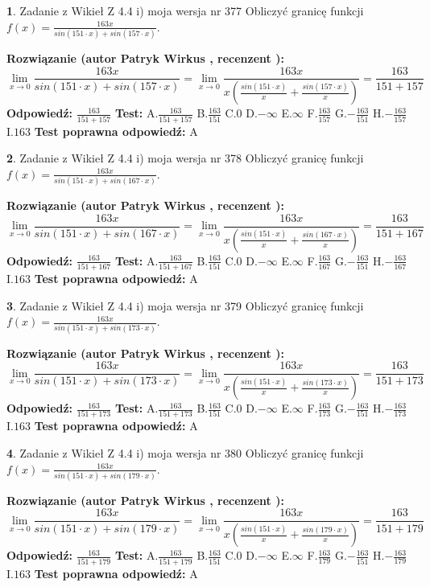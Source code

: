 \documentclass[12pt, a4paper]{article}
\theoremstyle{definition} %
\newtheorem{zad}{}
\newcommand{\zadStart}[1]{\begin{zad}#1\newline}
\newcommand{\zadStop}{\end{zad}}
\newcommand{\rozwStart}[2]{\noindent \textbf{Rozwiązanie (autor #1 , recenzent #2): }\newline}
\newcommand{\rozwStop}{\newline}
\newcommand{\odpStart}{\noindent \textbf{Odpowiedź:}\newline}
\newcommand{\odpStop}{\newline}
\newcommand{\testStart}{\noindent \textbf{Test:}\newline}
\newcommand{\testStop}{\newline}
\newcommand{\kluczStart}{\noindent \textbf{Test poprawna odpowiedź:}\newline}
\newcommand{\kluczStop}{\newline}
\begin{document}
\zadStart{Zadanie z Wikieł Z 4.4 i) moja wersja nr 377}
Obliczyć granicę funkcji $f(x)=\frac{163x}{sin(151\cdot x) +sin(157\cdot x)}$.
\zadStop
\rozwStart{Patryk Wirkus}{}
$$\lim\limits_{x\to 0}\frac{163x}{sin(151\cdot x) +sin(157\cdot x)}=\lim\limits_{x\to 0}\frac{163x}{x(\frac{sin(151\cdot x)}{x}+\frac{sin(157\cdot x)}{x})}=\frac{163}{151+157}$$
\rozwStop
\odpStart
$\frac{163}{151+157}$
\odpStop
\testStart
A.$\frac{163}{151+157}$
B.$\frac{163}{151}$
C.$0$
D.$-\infty$
E.$\infty$
F.$\frac{163}{157}$
G.$-\frac{163}{151}$
H.$-\frac{163}{157}$
I.$163$
\testStop
\kluczStart
A
\kluczStop



\zadStart{Zadanie z Wikieł Z 4.4 i) moja wersja nr 378}
Obliczyć granicę funkcji $f(x)=\frac{163x}{sin(151\cdot x) +sin(167\cdot x)}$.
\zadStop
\rozwStart{Patryk Wirkus}{}
$$\lim\limits_{x\to 0}\frac{163x}{sin(151\cdot x) +sin(167\cdot x)}=\lim\limits_{x\to 0}\frac{163x}{x(\frac{sin(151\cdot x)}{x}+\frac{sin(167\cdot x)}{x})}=\frac{163}{151+167}$$
\rozwStop
\odpStart
$\frac{163}{151+167}$
\odpStop
\testStart
A.$\frac{163}{151+167}$
B.$\frac{163}{151}$
C.$0$
D.$-\infty$
E.$\infty$
F.$\frac{163}{167}$
G.$-\frac{163}{151}$
H.$-\frac{163}{167}$
I.$163$
\testStop
\kluczStart
A
\kluczStop



\zadStart{Zadanie z Wikieł Z 4.4 i) moja wersja nr 379}
Obliczyć granicę funkcji $f(x)=\frac{163x}{sin(151\cdot x) +sin(173\cdot x)}$.
\zadStop
\rozwStart{Patryk Wirkus}{}
$$\lim\limits_{x\to 0}\frac{163x}{sin(151\cdot x) +sin(173\cdot x)}=\lim\limits_{x\to 0}\frac{163x}{x(\frac{sin(151\cdot x)}{x}+\frac{sin(173\cdot x)}{x})}=\frac{163}{151+173}$$
\rozwStop
\odpStart
$\frac{163}{151+173}$
\odpStop
\testStart
A.$\frac{163}{151+173}$
B.$\frac{163}{151}$
C.$0$
D.$-\infty$
E.$\infty$
F.$\frac{163}{173}$
G.$-\frac{163}{151}$
H.$-\frac{163}{173}$
I.$163$
\testStop
\kluczStart
A
\kluczStop



\zadStart{Zadanie z Wikieł Z 4.4 i) moja wersja nr 380}
Obliczyć granicę funkcji $f(x)=\frac{163x}{sin(151\cdot x) +sin(179\cdot x)}$.
\zadStop
\rozwStart{Patryk Wirkus}{}
$$\lim\limits_{x\to 0}\frac{163x}{sin(151\cdot x) +sin(179\cdot x)}=\lim\limits_{x\to 0}\frac{163x}{x(\frac{sin(151\cdot x)}{x}+\frac{sin(179\cdot x)}{x})}=\frac{163}{151+179}$$
\rozwStop
\odpStart
$\frac{163}{151+179}$
\odpStop
\testStart
A.$\frac{163}{151+179}$
B.$\frac{163}{151}$
C.$0$
D.$-\infty$
E.$\infty$
F.$\frac{163}{179}$
G.$-\frac{163}{151}$
H.$-\frac{163}{179}$
I.$163$
\testStop
\kluczStart
A
\kluczStop
\end{document}
